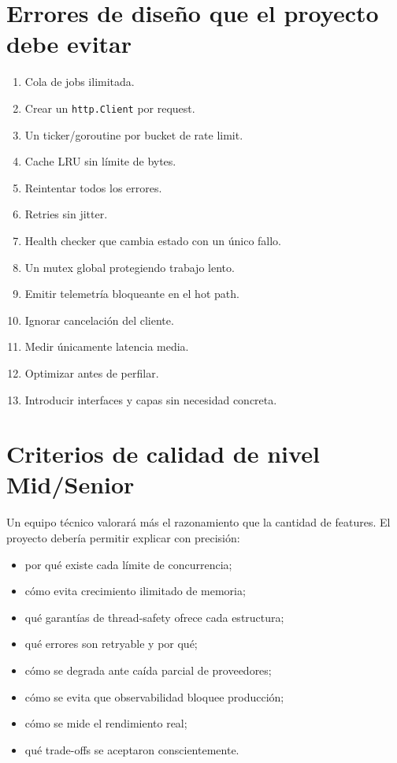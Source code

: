 \documentclass[11pt,a4paper]{article}
\newcommand{\code}[1]{\texttt{#1}}
\begin{document}
\section{Errores de diseño que el proyecto debe evitar}

\begin{enumerate}
  \item Cola de jobs ilimitada.
  \item Crear un \code{http.Client} por request.
  \item Un ticker/goroutine por bucket de rate limit.
  \item Cache LRU sin límite de bytes.
  \item Reintentar todos los errores.
  \item Retries sin jitter.
  \item Health checker que cambia estado con un único fallo.
  \item Un mutex global protegiendo trabajo lento.
  \item Emitir telemetría bloqueante en el hot path.
  \item Ignorar cancelación del cliente.
  \item Medir únicamente latencia media.
  \item Optimizar antes de perfilar.
  \item Introducir interfaces y capas sin necesidad concreta.
\end{enumerate}

\section{Criterios de calidad de nivel Mid/Senior}

Un equipo técnico valorará más el razonamiento que la cantidad de features. El proyecto debería permitir explicar con precisión:

\begin{itemize}
  \item por qué existe cada límite de concurrencia;
  \item cómo evita crecimiento ilimitado de memoria;
  \item qué garantías de thread-safety ofrece cada estructura;
  \item qué errores son retryable y por qué;
  \item cómo se degrada ante caída parcial de proveedores;
  \item cómo se evita que observabilidad bloquee producción;
  \item cómo se mide el rendimiento real;
  \item qué trade-offs se aceptaron conscientemente.
\end{itemize}
\end{document}
